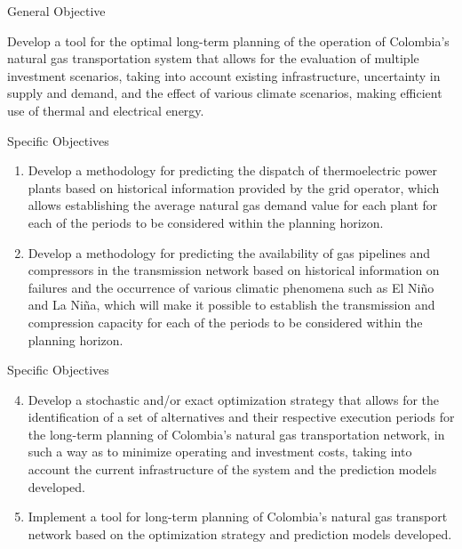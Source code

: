\documentclass[aspectratio=169,12pt]{beamer}
\begin{document}
\frame{\titlepage}

\begin{frame}{General Objective}
	\begin{block}{}
		Develop a tool for the optimal long-term planning of the operation of Colombia's natural gas transportation system that allows for the evaluation of multiple investment scenarios, taking into account existing infrastructure, uncertainty in supply and demand, and the effect of various climate scenarios, making efficient use of thermal and electrical energy.
	\end{block}
\end{frame}

\begin{frame}{Specific Objectives}
	\begin{block}{}
		\begin{enumerate}
			\item Develop a methodology for predicting the dispatch of thermoelectric power plants based on historical information provided by the grid operator, which allows establishing the average natural gas demand value for each plant for each of the periods to be considered within the planning horizon.
			
			\item Develop a methodology for predicting the availability of gas pipelines and compressors in the transmission network based on historical information on failures and the occurrence of various climatic phenomena such as El Niño and La Niña, which will make it possible to establish the transmission and compression capacity for each of the periods to be considered within the planning horizon.
		\end{enumerate}
	\end{block}
\end{frame}

\begin{frame}{Specific Objectives}
	\begin{block}{}
		\begin{enumerate}
			\setcounter{enumi}{3}
			\item Develop a stochastic and/or exact optimization strategy that allows for the identification of a set of alternatives and their respective execution periods for the long-term planning of Colombia's natural gas transportation network, in such a way as to minimize operating and investment costs, taking into account the current infrastructure of the system and the prediction models developed.
			
			\item Implement a tool for long-term planning of Colombia's natural gas transport network based on the optimization strategy and prediction models developed.
		\end{enumerate}
	\end{block}
\end{frame}
	
\end{document}
